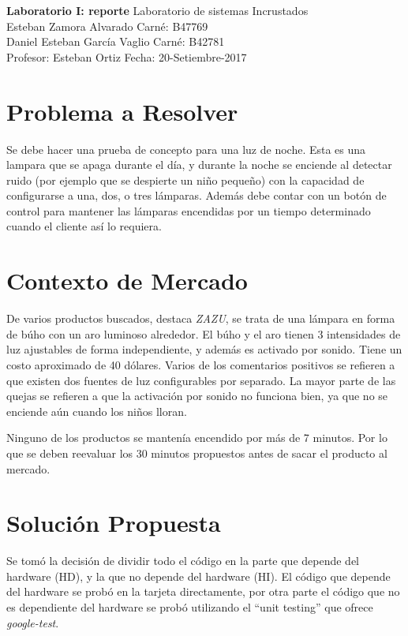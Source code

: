 

\noindent
\large\textbf{Laboratorio I: reporte} \hfill Laboratorio de sistemas Incrustados \\
\normalsize Esteban Zamora Alvarado \hfill Carné: B47769 \\
Daniel Esteban García Vaglio \hfill Carné: B42781 \\
Profesor: Esteban Ortiz  \hfill Fecha: 20-Setiembre-2017 \\

\section{Problema a Resolver}
Se debe hacer una prueba de concepto para una luz de noche. Esta es una lampara que se apaga durante
el día, y durante la noche se enciende al detectar ruido (por ejemplo que se despierte un niño pequeño)
con la capacidad de configurarse a una, dos, o tres lámparas. Además debe contar con un botón de
control para mantener las lámparas encendidas por un tiempo determinado cuando el cliente así lo
requiera. 

\section{Contexto de Mercado}

De varios productos buscados, destaca \textit{ZAZU}, se trata de una lámpara en forma de búho con un
aro luminoso alrededor. El búho y el aro tienen 3 intensidades de luz ajustables de forma
independiente, y además es activado por sonido. Tiene un costo aproximado de 40 dólares. Varios de
los comentarios positivos se refieren a que existen dos fuentes de luz configurables por
separado. La mayor parte de las quejas se refieren a que la activación por sonido no funciona bien,
ya que no se enciende aún cuando los niños lloran.

Ninguno de los productos se mantenía encendido por más de 7 minutos. Por lo que se deben reevaluar
los 30 minutos propuestos antes de sacar el producto al mercado.

\section{Solución Propuesta}

Se tomó la decisión de dividir todo el código en la parte que depende del hardware (HD), y la que no
depende del hardware (HI).  El código que depende del hardware se probó en la tarjeta directamente, por
otra parte el código que no es dependiente del hardware se probó utilizando el ``unit testing'' que
ofrece \textit{google-test}.

